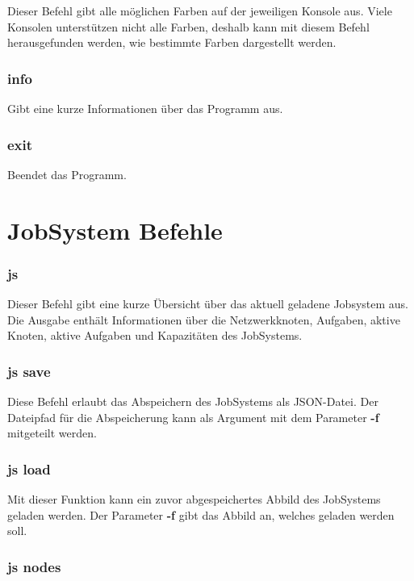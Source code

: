 \documentclass[11pt,a4paper]{report}
\begin{document}
Dieser Befehl gibt alle möglichen Farben auf der jeweiligen Konsole aus. Viele Konsolen unterstützen nicht alle Farben, deshalb kann mit diesem Befehl herausgefunden werden, wie bestimmte Farben dargestellt werden.

\subsubsection{info}

Gibt eine kurze Informationen über das Programm aus.

\subsubsection{exit}

Beendet das Programm.

\section{JobSystem Befehle}

\subsubsection{js}

Dieser Befehl gibt eine kurze Übersicht über das aktuell geladene Jobsystem aus. Die Ausgabe enthält Informationen über die Netzwerkknoten, Aufgaben, aktive Knoten, aktive Aufgaben und Kapazitäten des JobSystems.

\subsubsection{js save}

Diese Befehl erlaubt das Abspeichern des JobSystems als JSON-Datei. Der Dateipfad für die Abspeicherung kann als Argument mit dem Parameter \textbf{-f} mitgeteilt werden.

\subsubsection{js load}

Mit dieser Funktion kann ein zuvor abgespeichertes Abbild des JobSystems geladen werden. Der Parameter \textbf{-f} gibt das Abbild an, welches geladen werden soll.

\subsubsection{js nodes}
\end{document}
